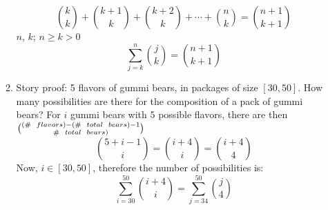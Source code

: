 \documentclass[11pt, oneside]{article}   	%
\begin{document}
\begin{enumerate}
\begin{enumerate}
					\[
						\binom{k}{k} + \binom{k+1}{k} + \binom{k+2}{k} + \cdots + \binom{n}{k} = \binom{n+1}{k+1}
					\]
					$n$, $k$; $n \geq k > 0$
					\[
						\sum_{j=k}^{n} \binom{j}{k} = \binom{n+1}{k+1}
					\]
				\item  Story proof: 5 flavors of gummi bears, in packages of size $[30, 50]$. How many possibilities are there for the composition of a pack of gummi bears?
					For $i$ gummi bears with $5$ possible flavors, there are then $\binom{(\# \hspace{2mm} flavors) - (\# \hspace{2mm} total \hspace{2mm} bears) - 1}{\# \hspace{2mm} total \hspace{2mm} bears)}$
					\[
						\binom{5 + i - 1}{i} = \binom{i + 4}{i} = \binom{i+4}{4}
					\]
					Now, $i \in [30, 50]$, therefore the number of possibilities is:
					\[
						\sum_{i=30}^{50} \binom{i+4}{i} = \sum_{j=34}^{50} \binom{j}{4}
					\]
			\end{enumerate}
	\end{enumerate}
\end{document}
